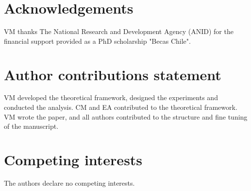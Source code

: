 \documentclass[11pt, a4paper]{article}
\begin{document}
\section*{Acknowledgements}

VM thanks The National Research and Development Agency (ANID) for the financial support provided as a PhD scholarship "Becas Chile".


\section*{Author contributions statement}
VM developed the theoretical framework, designed the experiments and conducted the analysis. CM and EA contributed to the theoretical framework. VM wrote the paper, and all authors contributed to the structure and fine tuning of the manuscript.

\section*{Competing interests}

The authors declare no competing interests.
\end{document}
